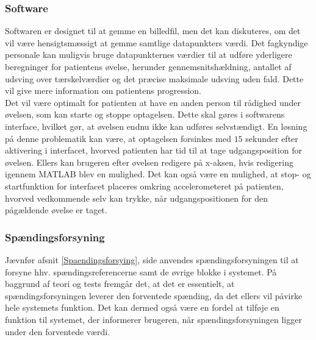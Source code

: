 \subsubsection{Software}
Softwaren er designet til at gemme en billedfil, men det kan diskuteres, om det vil være hensigtsmæssigt at gemme samtlige datapunkters værdi. Det fagkyndige personale kan muligvis bruge datapunkternes værdier til at udføre yderligere beregninger for patientens øvelse, herunder gennemsnitshældning, antallet af udsving over tærskelværdier og det præcise maksimale udsving uden fald. Dette vil give mere information om patientens progression. \\
Det vil være optimalt for patienten at have en anden person til rådighed under øvelsen, som kan starte og stoppe optagelsen. Dette skal gøres i softwarens interface, hvilket gør, at øvelsen endnu ikke kan udføres selvstændigt. En løsning på denne problematik kan være, at optagelsen forsinkes med $15$ sekunder efter aktivering i interfacet, hvorved patienten har tid til at tage udgangsposition for øvelsen. Ellers kan brugeren efter øvelsen redigere på x-aksen, hvis redigering igennem MATLAB blev en mulighed. Det kan også være en mulighed, at stop- og startfunktion for interfacet placeres omkring accelerometeret på patienten, hvorved vedkommende selv kan trykke, når udgangspositionen for den pågældende øvelse er taget.

\subsubsection{Spændingsforsyning}
Jævnfør afsnit \ref{Spaendingsforsying}, side \pageref{Spaendingsforsying} anvendes spændingsforsyningen til at forsyne hhv. spændingsreferencerne samt de øvrige blokke i systemet. På baggrund af teori og tests fremgår det, at det er essentielt, at spændingsforsyningen leverer den forventede spænding, da det ellers vil påvirke hele systemets funktion. Det kan dermed også være en fordel at tilføje en funktion til systemet, der informerer brugeren, når spændingsforsyningen ligger under den forventede værdi. 
 
